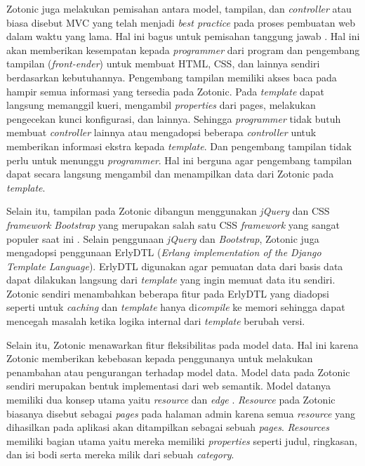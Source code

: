 Zotonic juga melakukan pemisahan antara model, tampilan, dan \textit{controller} atau biasa disebut MVC yang telah menjadi \textit{best practice} pada proses pembuatan web dalam waktu yang lama. Hal ini bagus untuk pemisahan tanggung jawab \citep{zotonic.mvc}. Hal ini akan memberikan kesempatan kepada \textit{programmer} dari program dan pengembang tampilan (\textit{front-ender}) untuk membuat HTML, CSS, dan lainnya sendiri berdasarkan kebutuhannya. Pengembang tampilan memiliki akses baca pada hampir semua informasi yang tersedia pada Zotonic. Pada \textit{template} dapat langsung memanggil kueri, mengambil \textit{properties} dari pages, melakukan pengecekan kunci konfigurasi, dan lainnya. Sehingga \textit{programmer} tidak butuh membuat \textit{controller} lainnya atau mengadopsi beberapa \textit{controller} untuk memberikan informasi ekstra kepada \textit{template}. Dan pengembang tampilan tidak perlu untuk menunggu \textit{programmer}. Hal ini berguna agar pengembang tampilan dapat secara langsung mengambil dan menampilkan data dari Zotonic pada \textit{template}.

Selain itu, tampilan pada Zotonic dibangun menggunakan \textit{jQuery} dan CSS \textit{framework Bootstrap} yang merupakan salah satu CSS \textit{framework} yang sangat populer saat ini \citep{awwwards.css}. Selain penggunaan \textit{jQuery} dan \textit{Bootstrap}, Zotonic juga mengadopsi penggunaan ErlyDTL (\textit{Erlang implementation of the Django Template Language}). ErlyDTL digunakan agar pemuatan data dari basis data dapat dilakukan langsung dari \textit{template} yang ingin memuat data itu sendiri. Zotonic sendiri menambahkan beberapa fitur pada ErlyDTL yang diadopsi seperti untuk \textit{caching} dan \textit{template} hanya di\textit{compile} ke memori sehingga dapat mencegah masalah ketika logika internal dari \textit{template} berubah versi.

Selain itu, Zotonic menawarkan fitur fleksibilitas pada model data. Hal ini karena Zotonic memberikan kebebasan kepada penggunanya untuk melakukan penambahan atau pengurangan terhadap model data. Model data pada Zotonic sendiri merupakan bentuk implementasi dari web semantik. Model datanya memiliki dua konsep utama yaitu \textit{resource} dan \textit{edge} \citep{zotonic.model}. \textit{Resource} pada Zotonic biasanya disebut sebagai \textit{pages} pada halaman admin karena semua \textit{resource} yang dihasilkan pada aplikasi akan ditampilkan sebagai sebuah \textit{pages}. \textit{Resources} memiliki bagian utama yaitu mereka memiliki \textit{properties} seperti judul, ringkasan, dan isi bodi serta mereka milik dari sebuah \textit{category}.

